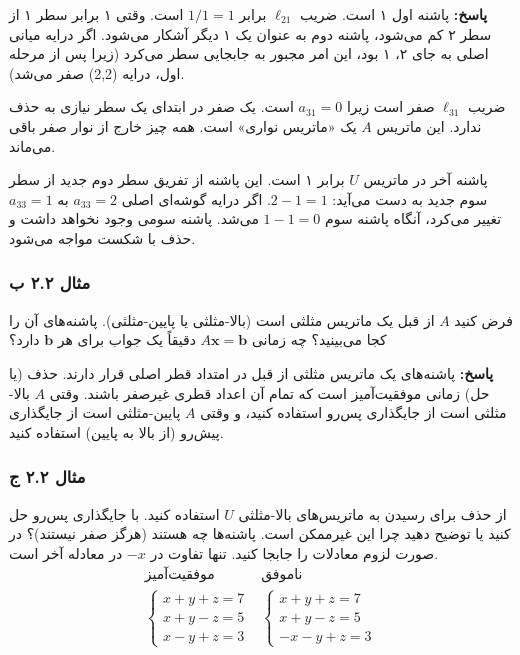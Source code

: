 \documentclass[12pt, a4paper]{book}
\theoremstyle{translator}
\begin{document}
	\textbf{پاسخ:}
	پاشنه اول ۱ است. ضریب $\ell_{21}$ برابر $1/1=1$ است. وقتی ۱ برابر سطر ۱ از سطر ۲ کم می‌شود، پاشنه دوم به عنوان یک ۱ دیگر آشکار می‌شود. اگر درایه میانی اصلی به جای ۲، ۱ بود، این امر مجبور به جابجایی سطر می‌کرد (زیرا پس از مرحله اول، درایه (2,2) صفر می‌شد).
	
	ضریب $\ell_{31}$ صفر است زیرا $a_{31}=0$ است. یک صفر در ابتدای یک سطر نیازی به حذف ندارد. این ماتریس $A$ یک «ماتریس نواری» است. همه چیز خارج از نوار صفر باقی می‌ماند.
	
	پاشنه آخر در ماتریس $U$ برابر ۱ است. این پاشنه از تفریق سطر دوم جدید از سطر سوم جدید به دست می‌آید: $2-1=1$. اگر درایه گوشه‌ای اصلی $a_{33}=2$ به $a_{33}=1$ تغییر می‌کرد، آنگاه پاشنه سوم $1-1=0$ می‌شد. پاشنه سومی وجود نخواهد داشت و حذف با شکست مواجه می‌شود.
	
	\subsubsection*{مثال ۲.۲ ب}
	فرض کنید $A$ از قبل یک ماتریس مثلثی است (بالا-مثلثی یا پایین-مثلثی). پاشنه‌های آن را کجا می‌بینید؟ چه زمانی $A\mathbf{x}=\mathbf{b}$ دقیقاً یک جواب برای هر $\mathbf{b}$ دارد؟
	
	\textbf{پاسخ:}
	پاشنه‌های یک ماتریس مثلثی از قبل در امتداد قطر اصلی قرار دارند. حذف (یا حل) زمانی موفقیت‌آمیز است که تمام آن اعداد قطری غیرصفر باشند. وقتی $A$ بالا-مثلثی است از جایگذاری پس‌رو استفاده کنید، و وقتی $A$ پایین-مثلثی است از جایگذاری پیش‌رو (از بالا به پایین) استفاده کنید.
	
	\subsubsection*{مثال ۲.۲ ج}
	از حذف برای رسیدن به ماتریس‌های بالا-مثلثی $U$ استفاده کنید. با جایگذاری پس‌رو حل کنید یا توضیح دهید چرا این غیرممکن است. پاشنه‌ها چه هستند (هرگز صفر نیستند)؟ در صورت لزوم معادلات را جابجا کنید. تنها تفاوت در $-x$ در معادله آخر است.
	\[
	\begin{array}{cc}
		\textbf{موفقیت‌آمیز} & \textbf{ناموفق} \\
		\begin{cases}
			x+y+z=7 \\
			x+y-z=5 \\
			x-y+z=3
		\end{cases}
		&
		\begin{cases}
			x+y+z=7 \\
			x+y-z=5 \\
			-x-y+z=3
		\end{cases}
	\end{array}
	\]
	
\end{document}
